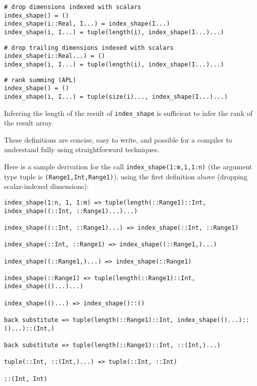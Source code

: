 \begin{verbatim}
# drop dimensions indexed with scalars
index_shape() = ()
index_shape(i::Real, I...) = index_shape(I...)
index_shape(i, I...) = tuple(length(i), index_shape(I...)...)
\end{verbatim}

\begin{verbatim}
# drop trailing dimensions indexed with scalars
index_shape(i::Real...) = ()
index_shape(i, I...) = tuple(length(i), index_shape(I...)...)
\end{verbatim}

\begin{verbatim}
# rank summing (APL)
index_shape() = ()
index_shape(i, I...) = tuple(size(i)..., index_shape(I...)...)
\end{verbatim}

Inferring the length of the result of \texttt{index\_shape} is sufficient
to infer the rank of the result array.

These definitions are concise, easy to write, and possible for a
compiler to understand fully using straightforward techniques.


Here is a sample derivation for the call \texttt{index\_shape(1:m,1,1:n)}
(the argument type tuple is \texttt{(Range1,Int,Range1)}), using the first
definition above (dropping scalar-indexed dimensions):

\begin{verbatim}
index_shape(1:n, 1, 1:m) => tuple(length(::Range1)::Int, index_shape((::Int, ::Range1)...)...)

index_shape((::Int, ::Range1)...) => index_shape(::Int, ::Range1)

index_shape(::Int, ::Range1) => index_shape((::Range1,)...)

index_shape((::Range1,)...) => index_shape(::Range1)

index_shape(::Range1) => tuple(length(::Range1)::Int, index_shape(()...)...)

index_shape(()...) => index_shape()::()

back substitute => tuple(length(::Range1)::Int, index_shape(()...)::()...)::(Int,)

back substitute => tuple(length(::Range1)::Int, ::(Int,)...)

tuple(::Int, ::(Int,)...) => tuple(::Int, ::Int)

::(Int, Int)

\end{verbatim}

